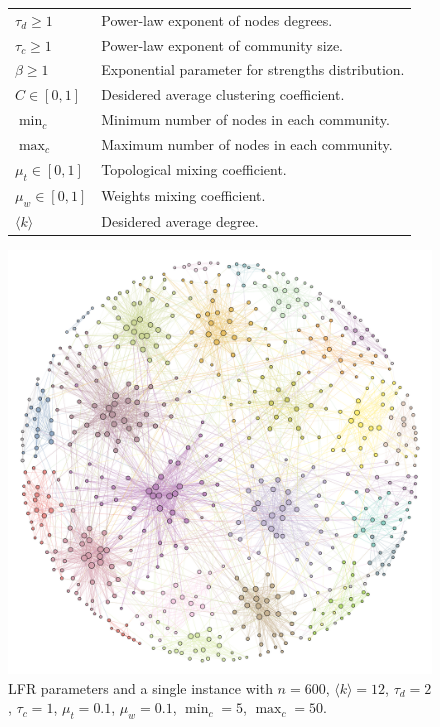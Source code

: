 \begin{figure}[htb!]\centering
	\begin{footnotesize}
		\begin{minipage}[b!]{0.5\textwidth}
			\begin{tabular}{l p{}}
			$\tau_d \geq 1$ & Power-law exponent of nodes degrees.\\
			$\tau_c \geq 1$ & Power-law exponent of community size.\\
			$\beta \geq 1$  &Exponential parameter for strengths distribution.\\
			$C \in [0,1]$ & Desidered average clustering coefficient.\\
			$\min_c$ & Minimum number of nodes in each community.\\
			$\max_c$  & Maximum number of nodes in each community.\\
			$\mu_t \in [0,1]$ & Topological mixing coefficient.\\
			$\mu_w \in [0,1]$ & Weights mixing coefficient.\\
			$\langle k\rangle $ &Desidered average degree.\\
			\end{tabular}
		\end{minipage}\hfill
		\begin{minipage}[b!]{0.35\textwidth}\flushright
			\includegraphics[width=1\textwidth]{images/LFRexample.pdf}
		\end{minipage}
	\end{footnotesize}
	\caption{LFR parameters and a single instance with $n=600$, $\langle k \rangle =12$, $\tau_d=2$, $\tau_c=1$, $\mu_t=0.1$, $\mu_w=0.1$, $\min_c=5$, $\max_c=50$.}
	\label{tab:lfrparams}
\end{figure}


